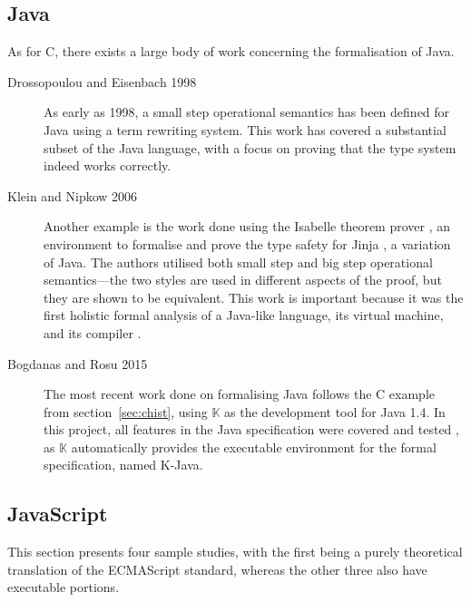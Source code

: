 \documentclass[a4paper,11pt,twoside]{report}
\begin{document}
\subsection{Java}
As for C, there exists a large body of work concerning the formalisation of Java. 
\begin{description}
\item[Drossopoulou and Eisenbach 1998] As early as 1998, a small step operational semantics has been defined for Java \cite{drossopoulou1998towards,Drossopoulou:1999} using a term rewriting system. This work has covered a substantial subset of the Java language, with a focus on proving that the type system indeed works correctly.

\item[Klein and Nipkow 2006] Another example is the work done using the Isabelle theorem prover \cite{Paulson1989}, an environment to formalise and prove the type safety for Jinja \cite{KleinN-TOPLAS}, a variation of Java. The authors utilised both small step and big step operational semantics---the two styles are used in different aspects of the proof, but they are shown to be equivalent. This work is important because it was the first holistic formal analysis of a Java-like language, its virtual machine, and its compiler \cite{KleinN-TOPLAS}.

\item[Bogdanas and Rosu 2015] The most recent work done on formalising Java follows the C example from section~\ref{sec:chist}, using $\mathbb{K}$ as the development tool for Java 1.4. In this project, all features in the Java specification were covered and tested \cite{Bogdanas:2015}, as $\mathbb{K}$ automatically provides the executable environment for the formal specification, named K-Java. 
\end{description}

\subsection{JavaScript}
This section presents four sample studies, with the first being a purely theoretical translation of the ECMAScript standard, whereas the other three also have executable portions.
\end{document}
